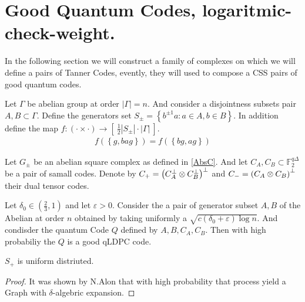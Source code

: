 \section{Good Quantum Codes, logaritmic-check-weight.} 
In the following section we will construct a family of complexes on which we will define a pairs of Tanner Codes, evently, they will used to compose a CSS pairs of good quantum codes.  

\begin{definition} \label{AbsC}
  Let $\Gamma$ be abelian group at order $|\Gamma| = n$. And consider a disjointness subsets pair $A,B \subset \Gamma$. Define the generators set $S_{\pm}  = \left\{ b^{\pm 1} a : a \in A, b \in B   \right\}$. In addition define the map $f : \left( \cdot \times \cdot \right) \rightarrow \left[ \ \frac{1}{2} |S_{\pm}| \cdot |\Gamma|  \ \right]  $. 
\begin{equation*}
  \begin{split}
    f\left( \left\{ g, ba g  \right\}  \right)= f\left( \left\{ bg, ag  \right\}  \right)
  \end{split}
\end{equation*}
\end{definition}

\begin{definition} Let $G_{\pm}$ be an abelian square complex as defined in \ref{AbsC}. And let $C_{A},C_{B} \subset \mathbb{F}_{2}^{q\Delta}$ be a pair of samall codes. Denote by $C_{+} = \left( C_{A}^{\perp}\otimes C_{B}^{\perp} \right)^{\perp}$ and $C_{-} = \left( C_{A}\otimes C_{B}\right)^{\perp} $ their dual tensor codes. 
\end{definition}


\begin{theorem*} 
Let $\delta_{0} \in \left( \frac{2}{3} ,1 \right)$ and let $\varepsilon > 0$. Consider the a pair of generator subset $A,B$ of the Abelian at order $n$ obtained by taking uniformly a $ \sqrt{ c\left( \delta_{0} + \varepsilon \right)\log n }$. And condisder the quantum Code $Q$ defined by $A,B,C_{A},C_{B}$.  Then with high probabiliy the $Q$ is a good qLDPC code.
\end{theorem*}
\begin{claim} \label{unif}
  $S_{+}$ is uniform distriuted. 
\end{claim}

\begin{proof}
It was shown by N.Alon  that with high probability that process yield a Graph with $\delta$-algebric expansion.
  \end{proof}
